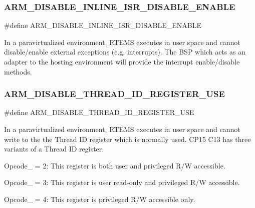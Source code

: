 \subsubsection{\texorpdfstring{ARM\_DISABLE\_INLINE\_ISR\_DISABLE\_ENABLE}{ARM\_DISABLE\_INLINE\_ISR\_DISABLE\_ENABLE}}
{\footnotesize\ttfamily \#define A\+R\+M\+\_\+\+D\+I\+S\+A\+B\+L\+E\+\_\+\+I\+N\+L\+I\+N\+E\+\_\+\+I\+S\+R\+\_\+\+D\+I\+S\+A\+B\+L\+E\+\_\+\+E\+N\+A\+B\+LE}

In a paravirtualized environment, R\+T\+E\+MS executes in user space and cannot disable/enable external exceptions (e.\+g. interrupts). The B\+SP which acts as an adapter to the hosting environment will provide the interrupt enable/disable methods. \mbox{\label{group__RTEMSScoreCPUARMParavirt_ga40957e1d781553cdfc2bc3573f1e04ec}} 
\subsubsection{\texorpdfstring{ARM\_DISABLE\_THREAD\_ID\_REGISTER\_USE}{ARM\_DISABLE\_THREAD\_ID\_REGISTER\_USE}}
{\footnotesize\ttfamily \#define A\+R\+M\+\_\+\+D\+I\+S\+A\+B\+L\+E\+\_\+\+T\+H\+R\+E\+A\+D\+\_\+\+I\+D\+\_\+\+R\+E\+G\+I\+S\+T\+E\+R\+\_\+\+U\+SE}

In a paravirtualized environment, R\+T\+E\+MS executes in user space and cannot write to the the Thread ID register which is normally used. C\+P15 C13 has three variants of a Thread ID register.


\begin{DoxyItemize}
\item Opcode\+\_ = 2\+: This register is both user and privileged R/W accessible.
\item Opcode\+\_ = 3\+: This register is user read-\/only and privileged R/W accessible.
\item Opcode\+\_ = 4\+: This register is privileged R/W accessible only. 
\end{DoxyItemize}